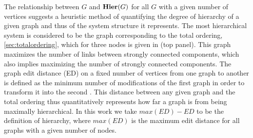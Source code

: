 The relationship between $G$ and $\mathbf{Hier}(G)$ for all $G$ with a given number of vertices suggests a heuristic method of quantifying the degree of hierarchy of a given graph and thus of the system structure it represents. The most hierarchical system is considered to be the graph corresponding to the total ordering, \ref{sec:totalordering}, which for three nodes is given in  (top panel). This graph maximizes the number of links between strongly connected components, which also implies maximizing the number of strongly connected components. The graph edit distance (ED) on a fixed number of vertices from one graph to another is defined as the minimum number of modifications of the first graph in order to transform it into the second \cite{Axenovich2011}. This distance between any given graph and the total ordering thus quantitatively represents how far a graph is from being maximally hierarchical. In this work we take $max(ED) - ED$ to be the definition of hierarchy, where $max(ED)$ is the maximum edit distance for all graphs with a given number of nodes.

